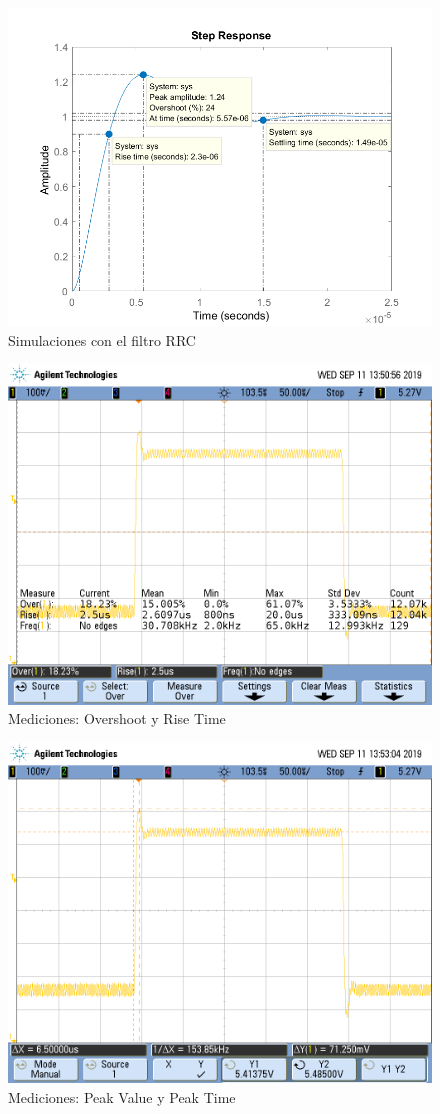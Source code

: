 \documentclass{article}
\begin{document}
\begin{figure}[H]
\centering
\includegraphics[width=0.8\linewidth]{images/05vpp/simu.PNG}
\caption{Simulaciones con el filtro RRC}
\label{fig:simu}
\end{figure}


\begin{figure}[H]
\centering
\includegraphics[width=0.8\linewidth]{images/05vpp/os_rt05vpp.PNG}
\caption{Mediciones: Overshoot y Rise Time}
\label{fig:os_rt05vpp}
\end{figure}

\begin{figure}[H]
\centering
\includegraphics[width=0.8\linewidth]{images/05vpp/tpeak_vpeak.PNG}
\caption{Mediciones: Peak Value y Peak Time}
\label{fig:tpeak_vpeak}
\end{figure}
\end{document}
